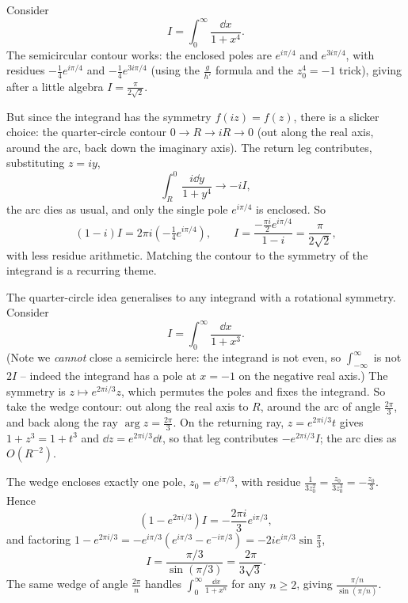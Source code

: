 \begin{example}
	Consider
	$$
	I = \int_0^\infty \frac{\dd x}{1 + x^4}.
	$$
	The semicircular contour works: the enclosed poles are $e^{i\pi/4}$ and $e^{3i\pi/4}$, with residues $-\frac{1}{4}e^{i\pi/4}$ and $-\frac{1}{4}e^{3i\pi/4}$ (using the $\frac{g}{h'}$ formula and the $z_0^4 = -1$ trick), giving after a little algebra $I = \frac{\pi}{2\sqrt 2}$.

	But since the integrand has the symmetry $f(iz) = f(z)$, there is a slicker choice: the quarter-circle contour $0 \to R \to iR \to 0$ (out along the real axis, around the arc, back down the imaginary axis). The return leg contributes, substituting $z = iy$,
	$$
	\int_R^0 \frac{i \dd y}{1 + y^4} \to -iI,
	$$
	the arc dies as usual, and only the single pole $e^{i\pi/4}$ is enclosed. So
	$$
	(1 - i) I = 2\pi i \left(-\tfrac 14 e^{i\pi/4}\right), \qquad I = \frac{-\frac{\pi i}{2} e^{i \pi /4}}{1 - i} = \frac{\pi}{2\sqrt{2}},
	$$
	with less residue arithmetic. Matching the contour to the symmetry of the integrand is a recurring theme.
\end{example}

\begin{example}
	The quarter-circle idea generalises to any integrand with a rotational symmetry. Consider
	$$
	I = \int_0^\infty \frac{\dd x}{1 + x^3}.
	$$
	(Note we \emph{cannot} close a semicircle here: the integrand is not even, so $\int_{-\infty}^\infty$ is not $2I$ -- indeed the integrand has a pole at $x = -1$ on the negative real axis.) The symmetry is $z \mapsto e^{2\pi i/3} z$, which permutes the poles and fixes the integrand. So take the wedge contour: out along the real axis to $R$, around the arc of angle $\frac{2\pi}{3}$, and back along the ray $\arg z = \frac{2\pi}{3}$. On the returning ray, $z = e^{2\pi i /3} t$ gives $1 + z^3 = 1 + t^3$ and $\dd z = e^{2\pi i/3} \dd t$, so that leg contributes $-e^{2\pi i /3} I$; the arc dies as $O(R^{-2})$.

	The wedge encloses exactly one pole, $z_0 = e^{i\pi/3}$, with residue $\frac{1}{3z_0^2} = \frac{z_0}{3 z_0^3} = -\frac{z_0}{3}$. Hence
	$$
	(1 - e^{2\pi i /3}) I = -\frac{2\pi i}{3} e^{i\pi/3},
	$$
	and factoring $1 - e^{2\pi i/3} = -e^{i\pi/3}(e^{i\pi/3} - e^{-i\pi/3}) = -2i e^{i\pi/3}\sin\frac\pi 3$,
	$$
	I = \frac{\pi/3}{\sin(\pi/3)} = \frac{2\pi}{3\sqrt 3}.
	$$
	The same wedge of angle $\frac{2\pi}{n}$ handles $\int_0^\infty \frac{\dd x}{1 + x^n}$ for any $n \geq 2$, giving $\frac{\pi/n}{\sin(\pi/n)}$.
\end{example}

